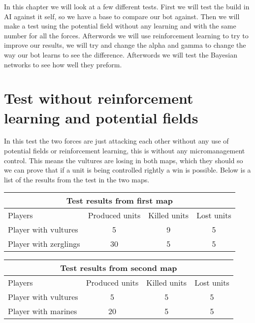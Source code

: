 
In this chapter we will look at a few different tests.
First we will test the build in AI against it self, so we have a base to compare our bot against. Then we will make a test using the potential field without any learning and with the same number for all the forces. Afterwords we will use reinforcement learning to try to improve our results, we will try and change the alpha and gamma to change the way our bot learns to see the difference. Afterwords we will test the Bayesian networks to see how well they preform.

\section{Test without reinforcement learning and potential fields} %
In this test the two forces are just attacking each other without any use of potential fields or reinforcement learning, this is without any micromanagement control. This means the vultures are losing in both maps, which they should so we can prove that if a unit is being controlled rightly a win is possible. Below is a list of the results from the test in the two maps.\\

\begin{centering}
 \begin{tabular}{|l|c|c|c|}
	\multicolumn{4}{c}{Test results from first map} \\
	\hline
		Players & Produced units & Killed units & Lost units\\
	\hline
	\hline
		Player with vultures & 5 & 9 & 5 \\
	\hline
		Player with zerglings & 30 & 5 & 5\\
	\hline

\end{tabular}
\end{centering}
\newpage

\begin{centering}
\begin{table}
 \begin{tabular}{|l|c|c|c|}
	\multicolumn{4}{c}{Test results from second map} \\
	\hline
	Players & Produced units & Killed units & Lost units\\
	\hline
		Player with vultures & 5 & 5 & 5\\
	\hline
		Player with marines & 20 & 5 & 5\\
	\hline

\end{tabular}
\end{table}
\end{centering}

